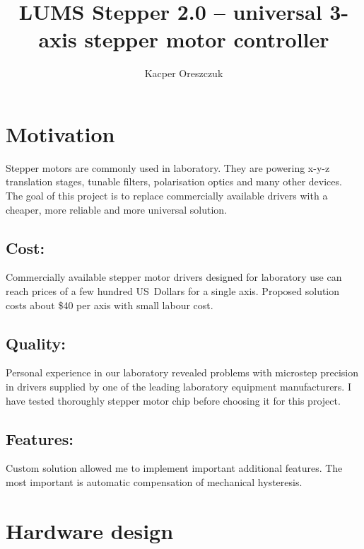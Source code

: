 \documentclass[10pt,article]{article}
\title{LUMS Stepper 2.0 -- universal 3-axis stepper motor controller}
\author{Kacper Oreszczuk}
\date{}
\begin{document}
\maketitle
 \section{Motivation}
Stepper motors are commonly used in laboratory. They are powering x-y-z translation stages, tunable filters, polarisation optics and many other devices. The goal of this project is to replace commercially available drivers with a cheaper, more reliable and more universal solution. 

\subsection*{Cost:}
Commercially available stepper motor drivers designed for laboratory use can reach prices
of a few hundred US\ Dollars for a single axis. Proposed solution costs about \$40 per axis with small
labour cost.

\subsection*{Quality:}
Personal experience in our laboratory revealed problems with microstep precision in drivers supplied by one of the leading laboratory equipment manufacturers. I have tested thoroughly stepper motor chip before choosing it for this project. 
\subsection*{Features:}
Custom solution allowed me to implement important additional features. The most important is automatic compensation of mechanical hysteresis.

\section{Hardware design}
\end{document}
